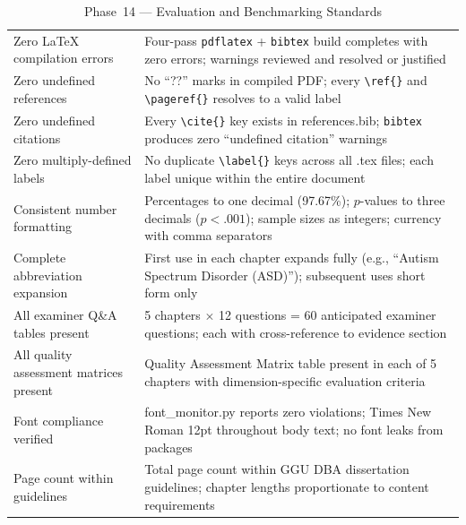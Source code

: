 \begingroup\singlespacing\tablefontsize\tablestripes
\begin{xltabular}{\textwidth}{@{} p{3.2cm} X @{}}
\caption{Phase~14 --- Evaluation and Benchmarking Standards}
\label{tab:phase14_benchmark}\\
\toprule
{} &  \\
\midrule
\endfirsthead
\endhead
\bottomrule
\endlastfoot
Zero LaTeX compilation errors              & Four-pass \texttt{pdflatex} + \texttt{bibtex} build completes with zero errors; warnings reviewed and resolved or justified \\
\addlinespace
Zero undefined references                  & No ``??\kern1pt'' marks in compiled PDF; every \texttt{\textbackslash ref\{\}} and \texttt{\textbackslash pageref\{\}} resolves to a valid label \\
\addlinespace
Zero undefined citations                   & Every \texttt{\textbackslash cite\{\}} key exists in references.bib; \texttt{bibtex} produces zero ``undefined citation'' warnings \\
\addlinespace
Zero multiply-defined labels               & No duplicate \texttt{\textbackslash label\{\}} keys across all .tex files; each label unique within the entire document \\
\addlinespace
Consistent number formatting               & Percentages to one decimal (97.67\%); $p$-values to three decimals ($p < .001$); sample sizes as integers; currency with comma separators \\
\addlinespace
Complete abbreviation expansion            & First use in each chapter expands fully (e.g., ``Autism Spectrum Disorder (ASD)''); subsequent uses short form only \\
\addlinespace
All examiner Q\&A tables present           & 5 chapters $\times$ 12 questions = 60 anticipated examiner questions; each with cross-reference to evidence section \\
\addlinespace
All quality assessment matrices present    & Quality Assessment Matrix table present in each of 5 chapters with dimension-specific evaluation criteria \\
\addlinespace
Font compliance verified                   & font\_monitor.py reports zero violations; Times New Roman 12pt throughout body text; no font leaks from packages \\
\addlinespace
Page count within guidelines               & Total page count within GGU DBA dissertation guidelines; chapter lengths proportionate to content requirements \\
\end{xltabular}
\endgroup

